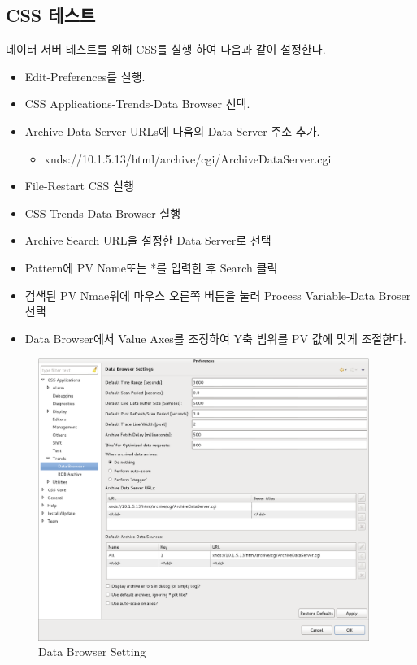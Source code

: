 \documentclass[11pt
  , a4paper
  , article
  , oneside
]{memoir}
\begin{document}
\subsection{CSS 테스트}
데이터 서버 테스트를 위해 CSS를 실행 하여 다음과 같이 설정한다.
\begin{itemize}
\item Edit-Preferences를 실행.
\item CSS Applications-Trends-Data Browser 선택.
\item Archive Data Server URLs에 다음의 Data Server 주소 추가.
 \begin{itemize}
 \item xnds://10.1.5.13/html/archive/cgi/ArchiveDataServer.cgi
 \end{itemize}
\item File-Restart CSS 실행
\item CSS-Trends-Data Browser 실행
\item Archive Search URL을 설정한 Data Server로 선택
\item Pattern에 PV Name또는 *를 입력한 후 Search 클릭
\item 검색된 PV Nmae위에 마우스 오른쪽 버튼을 눌러 Process Variable-Data Broser 선택
\item Data Browser에서 Value Axes를 조정하여 Y축 범위를 PV 값에 맞게 조절한다.
\end{itemize}

\begin{figure}[!htb]
  \centering
  \includegraphics[width=0.96\textwidth]{./images/databrowserset.png}
  \caption{
            Data Browser Setting
          }
  \label{fig:css_db_set}
\end{figure}
\end{document}

